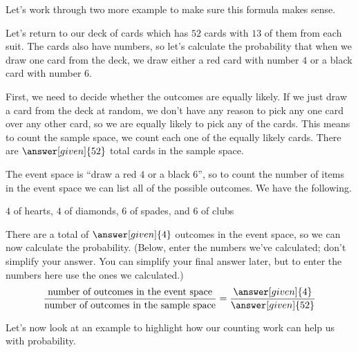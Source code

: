 \documentclass{ximera}
\begin{document}
Let's work through two more example to make sure this formula makes sense.
\begin{example}
Let's return to our deck of cards which has $52$ cards with $13$ of them from each suit. The cards also have numbers, so let's calculate the probability that when we draw one card from the deck, we draw either a red card with number $4$ or a black card with number $6$. 

First, we need to decide whether the outcomes are equally likely. If we just draw a card from the deck at random, we don't have any reason to pick any one card over any other card, so we are equally likely to pick any of the cards. This means to count the sample space, we count each one of the equally likely cards. There are $\answer[given]{52}$ total cards in the sample space.

The event space is ``draw a red $4$ or a black $6$'', so to count the number of items in the event space we can list all of the possible outcomes. We have the following.

\begin{center}
$4$ of hearts, $4$ of diamonds, $6$ of spades, and $6$ of clubs
\end{center}
There are a total of $\answer[given]{4}$ outcomes in the event space, so we can now calculate the probability. (Below, enter the numbers we've calculated; don't simplify your answer. You can simplify your final answer later, but to enter the numbers here use the ones we calculated.)
\[
\frac{\textrm{number of outcomes in the event space}}{\textrm{number of outcomes in the sample space}} = \frac{\answer[given]{4}}{\answer[given]{52}}
\]
\end{example}
Let's now look at an example to highlight how our counting work can help us with probability.
\end{document}
